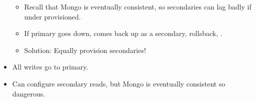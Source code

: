 \documentclass[xcolor=dvipsnames, 9pt]{beamer}
\begin{document}
\begin{frame}
\begin{columns}
\begin{column}{0.5\textwidth}
\begin{itemize}
                    \begin{itemize}
                        \item Recall that Mongo is eventually consistent, so
                            secondaries can lag badly if under provisioned.
                        \item If primary goes down, comes back up as a
                            secondary, rollsback, \frownie.
                        \item Solution: Equally provision secondaries!
                    \end{itemize}
                \item All writes go to primary.
                \item Can configure secondary reads, but Mongo is eventually
                    consistent so dangerous.
            \end{itemize}
        \end{column}
    \end{columns}
\end{frame}
\end{document}
